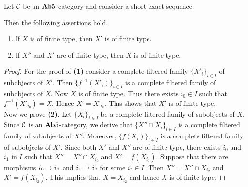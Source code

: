 \begin{proposition}\label{proposition:finitetypeandextensions}
Let ${\mathcal C}$ be an $\mathbf{Ab}5$-category and consider a short exact sequence
\begin{center}
\end{center}
Then the following assertions hold.
\begin{enumerate}[label=\emph{\textbf{(\arabic*)}}, leftmargin=3.0em]
\item If $X$ is of finite type, then $X'$ is of finite type.
\item If $X''$ and $X'$ are of finite type, then $X$ is of finite type.
\end{enumerate} 
\end{proposition}
\begin{proof}
For the proof of \textbf{(1)} consider a complete filtered family $\{X'_i\}_{i\in I}$ of subobjects of $X'$. Then $\{f^{-1}(X'_i)\}_{i\in I}$ is a complete filtered family of subobjects of $X$. Now $X$ is of finite type. Thus there exists $i_0\in I$ such that $f^{-1}(X'_{i_0})=X$. Hence $X' = X'_{i_0}$. This shows that $X'$ is of finite type.\\
Now we prove \textbf{(2)}. Let $\{X_i\}_{i\in I}$ be a complete filtered family of subobjects of $X$. Since ${\mathcal C}$ is an $\mathbf{Ab}5$-category, we derive that $\{X''\cap X_i\}_{i \in I}$ is a complete filtered family of subobjects of $X''$. Moreover, $\{f(X_i)\}_{i\in I}$ is a complete filtered family of subobjects of $X'$. Since both $X'$ and $X''$ are of finite type, there exists $i_0$ and $i_1$ in $I$ such that $X''=X''\cap X_{i_0}$ and $X' =f(X_{i_1})$. Suppose that there are morphisms $i_0\rightarrow i_2$ and $i_1\rightarrow i_2$ for some $i_2\in I$. Then $X'' = X''\cap X_{i_2}$ and $X' = f(X_{i_2})$. This implies that $X = X_{i_2}$ and hence $X$ is of finite type.
\end{proof}

